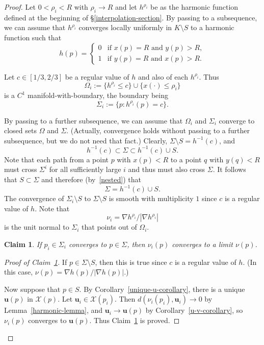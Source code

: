 \documentclass{amsart}
\newcommand{\Xx}{\mathcal{X}}
\newcommand{\uu}{\mathbf{u}}
\newtheorem{claim}{Claim}
\theoremstyle{definition}
\theoremstyle{definition}
\begin{document}
\begin{proof}
Let $0<\rho_i<R$ with $\rho_i\to R$ and let $h^{\rho_i}$ be as the harmonic
function defined at the beginning of \S\ref{interpolation-section}.
By passing to a subsequence, we can assume that $h^{\rho_i}$ converges locally uniformly
in $K\setminus S$ to a harmonic function such that
\[
h(p)
=
\begin{cases}
0    &\text{if $x(p)=R$ and $y(p)>R$}, \\
1    &\text{if $y(p)=R$ and $x(p)>R$}.
\end{cases}
\]


 
Let $c\in [1/3,2/3]$ be a regular value of $h$ and also of each $h^{\rho_i}$.
Thus
\[
  \Omega_i:=\{h^{\rho_i}\le c\}\cup \{x(\cdot)\le \rho_i\}
\]
is a $C^1$ manifold-with-boundary, the boundary being
\[
   \Sigma_i := \{p:  h^{\rho_i}(p)=c\}.
\]

By passing to a further subsequence, we can assume that $\Omega_i$ and $\Sigma_i$
converge to closed sets $\Omega$ and $\Sigma$.  (Actually, convergence holds
 without passing to a further subsequence, but we do not need that fact.)
Clearly, $\Sigma\setminus S= h^{-1}(c)$, and
\begin{equation}\label{nested}
   h^{-1}(c) \subset \Sigma \subset h^{-1}(c) \cup S.
\end{equation}
Note that each path from a point $p$ with $x(p)<R$ to a point $q$ with $y(q)<R$
must cross $\Sigma^i$ for all sufficiently large $i$ and thus must also cross $\Sigma$.
It follows that $S\subset \Sigma$ and therefore (by~\eqref{nested}) that
\[
    \Sigma = h^{-1}(c) \cup S.
\]
The convergence of $\Sigma_i \setminus S$ to $\Sigma\setminus S$
is smooth with multiplicity $1$ since $c$ is a regular value of $h$.
Note that
\[
  \nu_i = \nabla h^{\rho_i}/ |\nabla h^{\rho_i}|
\]
is the unit normal to $\Sigma_i$ that points out of $\Omega_i$.

\begin{claim}\label{convergence-claim} If $p_i\in \Sigma_i$ converges to $p\in \Sigma$,
then $\nu_i(p)$ converges to a limit $\nu(p)$.
\end{claim}

\begin{proof}[Proof of Claim~\ref{convergence-claim}]
If $p\in \Sigma\setminus S$, then this is true since $c$ is a regular value
of $h$.  (In this case, $\nu(p)= \nabla h(p)/ |\nabla h(p)|$.)

Now suppose that $p\in S$.
By Corollary~\ref{unique-u-corollary}, there is a unique $\uu(p)$ in $\Xx(p)$.
Let $\uu_i\in \Xx(p_i)$.  
Then $d(\nu_i(p_i), \uu_i) \to 0$ by Lemma~\ref{harmonic-lemma},
and $\uu_i\to \uu(p)$ by Corollary~\ref{u-v-corollary},
so $\nu_i(p)$
converges to $\uu(p)$.
Thus Claim~\ref{convergence-claim} is proved.
\end{proof}


\end{proof}
\end{document}
